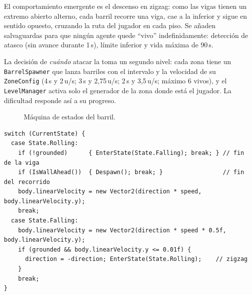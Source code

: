 \documentclass[runningheads]{llncs}
\begin{document}
El comportamiento emergente es el descenso en zigzag: como las vigas tienen un extremo abierto
alterno, cada barril recorre una viga, cae a la inferior y sigue en sentido opuesto, cruzando la ruta del
jugador en cada piso. Se añaden salvaguardas para que ningún agente quede ``vivo'' indefinidamente:
detección de atasco (sin avance durante 1\,s), límite inferior y vida máxima de 90\,s.

La decisión de \emph{cuándo} atacar la toma un segundo nivel: cada zona tiene un
\texttt{BarrelSpawner} que lanza barriles con el intervalo y la velocidad de su \texttt{ZoneConfig}
(4\,s y 2\,u/s; 3\,s y 2,75\,u/s; 2\,s y 3,5\,u/s; máximo 6 vivos), y el \texttt{LevelManager} activa
solo el generador de la zona donde está el jugador. La dificultad responde así a su progreso.

\begin{figure}[H]
\centering
{}
\caption{Máquina de estados del barril.}\label{fig:fsm}
\end{figure}

\par\noindent\begin{minipage}{\linewidth}
\begin{lstlisting}[caption={Núcleo de la máquina de estados (\texttt{BarrelController.cs}).},label=lst:fsm]
switch (CurrentState) {
  case State.Rolling:
    if (!grounded)      { EnterState(State.Falling); break; } // fin de la viga
    if (IsWallAhead())  { Despawn(); break; }                 // fin del recorrido
    body.linearVelocity = new Vector2(direction * speed, body.linearVelocity.y);
    break;
  case State.Falling:
    body.linearVelocity = new Vector2(direction * speed * 0.5f, body.linearVelocity.y);
    if (grounded && body.linearVelocity.y <= 0.01f) {
      direction = -direction; EnterState(State.Rolling);    // zigzag
    }
    break;
}
\end{lstlisting}
\end{minipage}\par
\end{document}

